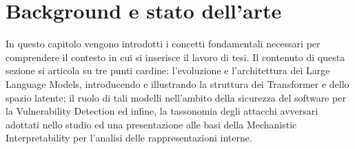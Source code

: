 \chapter{Background e stato dell'arte}
In questo capitolo vengono introdotti i concetti fondamentali necessari per comprendere il contesto in cui si inserisce il lavoro di tesi. Il contenuto di questa sezione si articola su tre punti cardine: l'evoluzione e l'architettura dei Large Language Models, introducendo e illustrando la struttura dei Transformer e dello spazio latente; il ruolo di tali modelli nell'ambito della sicurezza del software per la Vulnerability Detection ed infine, la tassonomia degli attacchi avversari adottati nello studio ed una presentazione alle basi della Mechanistic Interpretability per l'analisi delle rappresentazioni interne.









